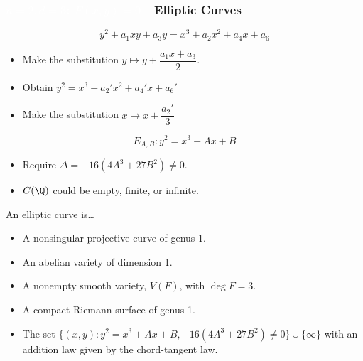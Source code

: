 \begin{frame}[plain]

\end{frame}



\begin{frame}[plain]
\frametitle{\textcolor{white}{$n=2, d=3$: $F(x,y)=0$}---Elliptic Curves}
	\[
	y^2 + a_1 xy + a_3y = x^3 + a_2 x^2 + a_4 x + a_6
	\] \pspace \pause

\begin{itemize}
\item Make the substitution $y \mapsto y + \dfrac{a_1 x+a_3}{2}$.
\item Obtain $y^2= x^3+ a_2' x^2 + a_4' x + a_6'$
\item Make the substitution $x \mapsto x + \dfrac{a_2'}{3}$
\end{itemize} \pspace \pause
	\[
	E_{A,B}: y^2 = x^3 + Ax + B
	\] \pspace

\begin{itemize}
\item Require $\Delta= -16(4A^3+27B^2) \neq 0$.
\item $C(\Q)$ could be empty, finite, or infinite. 
\end{itemize}
\end{frame}



\begin{frame}[plain]
\begin{dfn}
An elliptic curve is\dots
\begin{itemize}
\item A nonsingular projective curve of genus 1.
\item An abelian variety of dimension 1.
\item A nonempty smooth variety, $V(F)$, with $\deg F=3$.
\item A compact Riemann surface of genus 1.
\item The set $\{(x,y) \colon y^2= x^3 + Ax + B, -16(4A^3+27B^2) \neq 0\} \cup \{\infty\}$ with an addition law given by the chord-tangent law. 
\end{itemize}
\end{dfn}
\end{frame}




